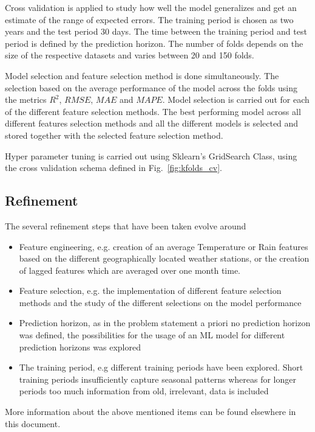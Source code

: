 \documentclass{article}
\begin{document}
Cross validation is applied to study how well the model generalizes and get an estimate of the range of expected errors. The training period is chosen as two years and the test period 30 days. The time between the training period and test period is defined by the prediction horizon. The number of folds depends on the size of the respective datasets and varies between 20 and 150 folds.

Model selection and feature selection method is done simultaneously.  The selection based on the average performance of the model across the folds using the metrics $R^2$, $RMSE$, $MAE$ and $MAPE$. Model selection is carried out for each of the different feature selection methods. The best performing model across all different features selection methods and all the different models is selected and stored together with the selected feature selection method.

Hyper parameter tuning is carried out using Sklearn's GridSearch Class, using the cross validation schema defined in Fig.~\ref{fig:kfolds_cv}. 



\subsection*{Refinement}

The several refinement steps that have been taken evolve around
\begin{itemize}
\item Feature engineering, e.g. creation of an average Temperature or Rain features based on the different geographically located weather stations, or the creation of lagged features which are averaged over one month time.
\item Feature selection, e.g. the implementation of different feature selection methods and the study of the different selections on the model performance
\item Prediction horizon, as in the problem statement a priori no prediction horizon was defined, the possibilities for the usage of an ML model for different prediction horizons was explored
\item The training period, e.g different training periods have been explored. Short training periods insufficiently capture seasonal patterns whereas for longer periods too much information from old, irrelevant, data is included
\end{itemize}

More information about the above mentioned items can be found elsewhere in this document.
\end{document}
